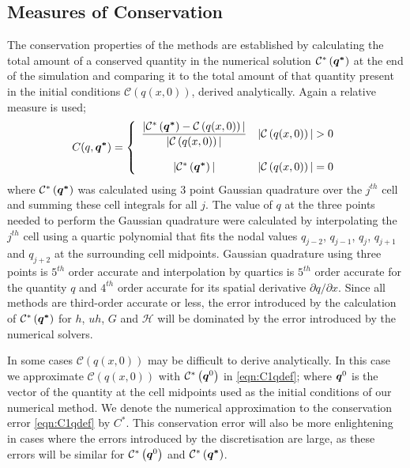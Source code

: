 \subsection{Measures of Conservation}
The conservation properties of the methods are established by calculating the total amount of a conserved quantity in the numerical solution $\mathcal{C}^*\left({\boldsymbol{q^*}}\right)$ at the end of the simulation and comparing it to the total amount of that quantity present in the initial conditions $\mathcal{C}\left({q(x,0)} \right)$, derived analytically. Again a relative measure is used;
\begin{equation}
C(q,\boldsymbol{q^*}) =  \left\lbrace \begin{array}{c r} 
\dfrac{|\mathcal{C}^*\left({\boldsymbol{q^*}}\right) - \mathcal{C}\left({q(x,0)} \right)| }{|\mathcal{C}\left({q(x,0)} \right)|} & |\mathcal{C}\left({q(x,0)} \right)| > 0 \\ \\
|\mathcal{C}^*\left({\boldsymbol{q^*}}\right)| & |\mathcal{C}\left({q(x,0)} \right)| = 0  \end{array}\right. 
\label{eqn:C1qdef} 
\end{equation}
where $\mathcal{C}^*\left({\boldsymbol{q^*}}\right)$ was calculated using 3 point Gaussian quadrature over the $j^{th}$ cell and summing these cell integrals for all $j$. The value of $q$ at the three points needed to perform the Gaussian quadrature were calculated by interpolating the $j^{th}$ cell using a quartic polynomial that fits the nodal values $q_{j-2}$, $q_{j-1}$, $q_{j}$, $q_{j+1}$ and $q_{j+2}$ at the surrounding cell midpoints. Gaussian quadrature using three points is $5^{th}$ order accurate and interpolation by quartics is $5^{th}$ order accurate for the quantity $q$ and $4^{th}$ order accurate for its spatial derivative $\partial q /  \partial x$. Since all methods are third-order accurate or less, the error introduced by the calculation of $\mathcal{C}^*\left({\boldsymbol{q^*}}\right)$ for $h$, $uh$, $G$ and $\mathcal{H}$ will be dominated by the error introduced by the numerical solvers.

In some cases $\mathcal{C}\left({q(x,0)} \right)$ may be difficult to derive analytically. In this case we approximate $\mathcal{C}\left({q(x,0)} \right)$ with $\mathcal{C}^*\left(\boldsymbol{q}^0\right)$ in \eqref{eqn:C1qdef}; where $\boldsymbol{q}^0$ is the vector of the quantity at the cell midpoints used as the initial conditions of our numerical method. We denote the numerical approximation to the conservation error \eqref{eqn:C1qdef} by $C^*$. This conservation error will also be more enlightening in cases where the errors introduced by the discretisation are large, as these errors will be similar for $\mathcal{C}^*\left(\boldsymbol{q}^0\right)$ and $\mathcal{C}^*\left(\boldsymbol{q^*}\right)$. 


